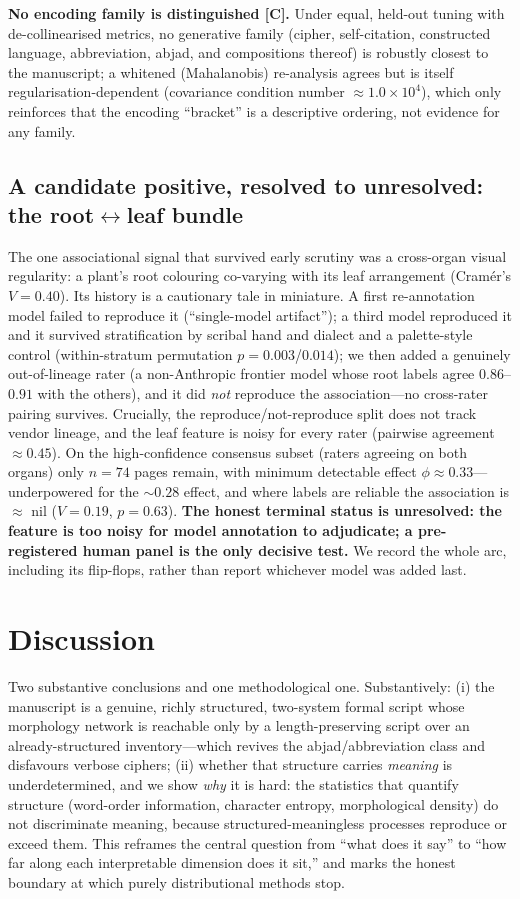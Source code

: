 \documentclass[11pt]{article}
\newcommand{\grade}[1]{{\small\textbf{[#1]}}}
\begin{document}
\textbf{No encoding family is distinguished \grade{C}.} Under equal, held-out tuning
with de-collinearised metrics, no generative family (cipher, self-citation,
constructed language, abbreviation, abjad, and compositions thereof) is robustly
closest to the manuscript; a whitened (Mahalanobis) re-analysis agrees but is itself
regularisation-dependent (covariance condition number $\approx 1.0\times10^{4}$),
which only reinforces that the encoding ``bracket'' is a descriptive ordering, not
evidence for any family.

\subsection{A candidate positive, resolved to unresolved: the root$\leftrightarrow$leaf bundle}
The one associational signal that survived early scrutiny was a cross-organ visual
regularity: a plant's root colouring co-varying with its leaf arrangement (Cram\'er's
$V=0.40$). Its history is a cautionary tale in miniature. A first re-annotation model
failed to reproduce it (``single-model artifact''); a third model reproduced it and it
survived stratification by scribal hand and dialect and a palette-style control
(within-stratum permutation $p=0.003$/$0.014$); we then added a genuinely
out-of-lineage rater (a non-Anthropic frontier model whose root labels agree
$0.86$--$0.91$ with the others), and it did \emph{not} reproduce the association---no
cross-rater pairing survives. Crucially, the reproduce/not-reproduce split does not
track vendor lineage, and the leaf feature is noisy for every rater (pairwise
agreement $\approx 0.45$). On the high-confidence consensus subset (raters agreeing on
both organs) only $n=74$ pages remain, with minimum detectable effect $\phi\approx
0.33$---underpowered for the $\sim 0.28$ effect, and where labels are reliable the
association is $\approx$ nil ($V=0.19$, $p=0.63$). \textbf{The honest terminal status
is unresolved: the feature is too noisy for model annotation to adjudicate; a
pre-registered human panel is the only decisive test.} We record the whole arc,
including its flip-flops, rather than report whichever model was added last.

\section{Discussion}
Two substantive conclusions and one methodological one. Substantively: (i) the
manuscript is a genuine, richly structured, two-system formal script whose morphology
network is reachable only by a length-preserving script over an already-structured
inventory---which revives the abjad/abbreviation class and disfavours verbose ciphers;
(ii) whether that structure carries \emph{meaning} is underdetermined, and we show
\emph{why} it is hard: the statistics that quantify structure (word-order information,
character entropy, morphological density) do not discriminate meaning, because
structured-meaningless processes reproduce or exceed them. This reframes the central
question from ``what does it say'' to ``how far along each interpretable dimension does
it sit,'' and marks the honest boundary at which purely distributional methods stop.
\end{document}
